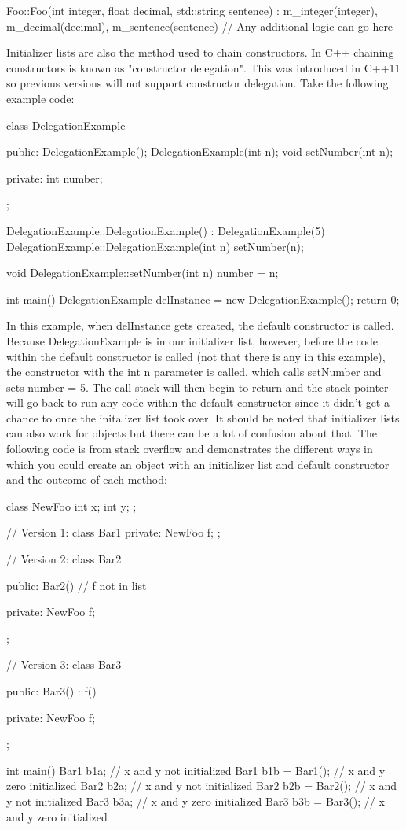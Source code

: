 \documentclass{article}
\begin{document}
\begin{cpplst}
Foo::Foo(int integer, float decimal, std::string sentence) :
	m_integer(integer), m_decimal(decimal), m_sentence(sentence)
{
    // Any additional logic can go here
}
\end{cpplst}

Initializer lists are also the method used to chain constructors. In C++ chaining constructors is known as
"constructor delegation". This was introduced in C++11 so previous versions will not support constructor
delegation. Take the following example code:

\begin{cpplst}
class DelegationExample
{
public:
	DelegationExample();
	DelegationExample(int n);
	void setNumber(int n);

private:
	int number;
};

DelegationExample::DelegationExample() : DelegationExample(5) {}
DelegationExample::DelegationExample(int n)
{
	setNumber(n);
}

void DelegationExample::setNumber(int n)
{
    number = n;
}

int main()
{
    DelegationExample delInstance = new DelegationExample();
	return 0;
}
\end{cpplst}

In this example, when delInstance gets created, the default constructor is called. Because DelegationExample
is in our initializer list, however, before the code within the default constructor is called (not that there
is any in this example), the constructor with the int n parameter is called, which calls setNumber and sets
number = 5. The call stack will then begin to return and the stack pointer will go back to run any code within
the default constructor since it didn’t get a chance to once the initalizer list took over. It should be noted
that initializer lists can also work for objects but there can be a lot of confusion about that. The following
code is from stack overflow and demonstrates the different ways in which you could create an object with an
initializer list and default constructor and the outcome of each method:

\begin{cpplst}
class NewFoo
{
    int x;
    int y;
};

// Version 1:
class Bar1
{
private:
    NewFoo f;
};

// Version 2:
class Bar2
{
 public:
     Bar2() {} // f not in list

private:
     NewFoo f;
};

// Version 3:
class Bar3
{
public:
    Bar3() : f() {}

private:
    NewFoo f;
};

int main()
{
    Bar1 b1a;           // x and y not  initialized
    Bar1 b1b = Bar1();  // x and y zero initialized
    Bar2 b2a;           // x and y not  initialized
    Bar2 b2b = Bar2();  // x and y not  initialized
    Bar3 b3a;           // x and y zero initialized
    Bar3 b3b = Bar3();  // x and y zero initialized
}
\end{cpplst}
\end{document}
